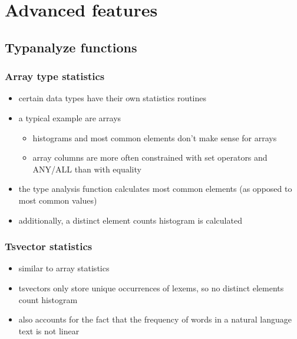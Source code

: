 \documentclass{beamer}
\begin{document}
\section{Advanced features}
\subsection{Typanalyze functions}

\begin{frame}
  \frametitle{Array type statistics}

  \begin{itemize}
  \item certain \alert{data types} have their own statistics routines
  \item a typical example are \alert{arrays}
    \begin{itemize}
    \item histograms and most common elements \alert{don't make sense} for
      arrays
    \item array columns are more often constrained with \alert{set operators}
      and \alert{ANY/ALL} than with equality
    \end{itemize}
  \item the type analysis function calculates \alert{most common elements} (as
    opposed to \alert{most common values})
  \item additionally, a \alert{distinct element counts histogram} is calculated
  \end{itemize}
\end{frame}

\begin{frame}
  \frametitle{Tsvector statistics}

  \begin{itemize}
  \item similar to \alert{array statistics}
  \item tsvectors only store \alert{unique occurrences} of lexems, so no distinct
    elements count histogram
  \item also accounts for the fact that the \alert{frequency of words} in a
    natural language text is not linear
  \end{itemize}
\end{frame}
\end{document}
